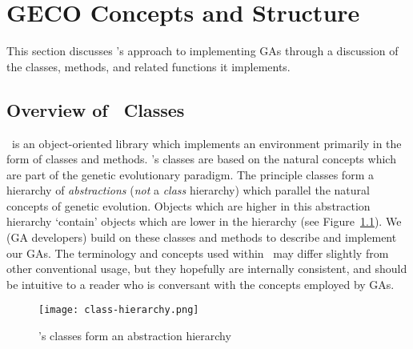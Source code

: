 \chapter{GECO Concepts and Structure}

This section discusses 
\geco's approach to implementing GAs through a discussion of the classes, 
methods, and related functions it implements.

\section{Overview of \Geco\ Classes}

\Geco\ is an object-oriented library which implements an
environment primarily in the form of classes and methods. \Geco's classes are based
on the natural concepts which are part of the genetic evolutionary paradigm. The
principle classes form a hierarchy of {\em abstractions} ({\em not} a {\em class} hierarchy) which parallel the natural concepts
of genetic evolution. Objects which are higher in this abstraction hierarchy
`contain' objects which are lower in the hierarchy (see
Figure~\ref{fig:class-hierarchy}). We (GA developers) build on these classes and
methods to describe and implement our GAs. The terminology
and concepts used within \geco\ may differ slightly from other
conventional usage, but they hopefully are internally consistent, and should be
intuitive to a reader who is conversant with the concepts employed by GAs.

\begin{figure}[!htbp]
  \centering
  \texttt{[image: class-hierarchy.png]}
  \caption{\Geco's classes form an abstraction hierarchy}
  \label{fig:class-hierarchy}
\end{figure}


